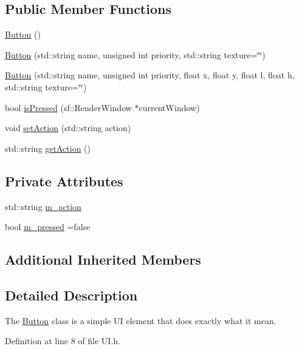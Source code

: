 \subsection*{Public Member Functions}
\begin{DoxyCompactItemize}
\item 
\hyperlink{class_button_a3b36df1ae23c58aedb9e15a713159459}{Button} ()
\item 
\hyperlink{class_button_a08181944cf12e0e960ba74bdf7cef98e}{Button} (std\-::string name, unsigned int priority, std\-::string texture=\char`\"{}\char`\"{})
\item 
\hyperlink{class_button_ab53e47e7822bd9002eda4f397ffda854}{Button} (std\-::string name, unsigned int priority, float x, float y, float l, float h, std\-::string texture=\char`\"{}\char`\"{})
\item 
bool \hyperlink{class_button_af0c0bca46462e357cd32d007d93d660c}{is\-Pressed} (sf\-::\-Render\-Window $\ast$current\-Window)
\item 
void \hyperlink{class_button_a0d037b742c501f7deb1b4da1a2f3c2a8}{set\-Action} (std\-::string action)
\item 
std\-::string \hyperlink{class_button_a7aafbc7deaf432112e14e9738a2e649a}{get\-Action} ()
\end{DoxyCompactItemize}
\subsection*{Private Attributes}
\begin{DoxyCompactItemize}
\item 
std\-::string \hyperlink{class_button_a2ac72251ae697e3b8f248254d24be694}{m\-\_\-action}
\item 
bool \hyperlink{class_button_a14a55f491951ad95a650bd30111ce1cb}{m\-\_\-pressed} =false
\end{DoxyCompactItemize}
\subsection*{Additional Inherited Members}


\subsection{Detailed Description}
The \hyperlink{class_button}{Button} class is a simple U\-I element that does exactly what it mean. 

Definition at line 8 of file U\-I.\-h.



